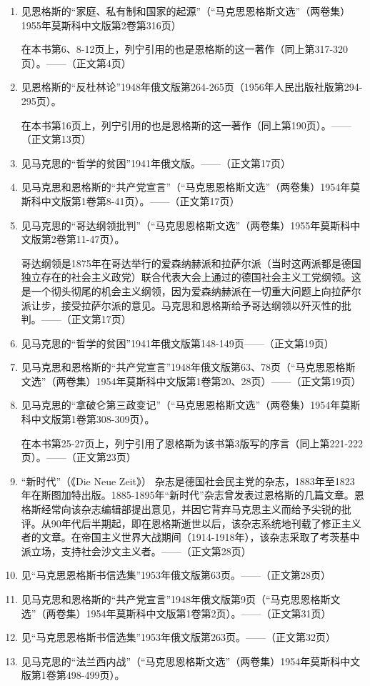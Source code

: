 \begin{enumerate}
	\item 见恩格斯的“家庭、私有制和国家的起源”（“马克思恩格斯文选”（两卷集）1955年莫斯科中文版第2卷第316页）
	
		在本书第6、8-12页上，列宁引用的也是恩格斯的这一著作（同上第317-320页）。——（正文第4页）
	\item 见恩格斯的“反杜林论”1948年俄文版第264-265页（1956年人民出版社版第294-295页）。
	
		在本书第16页上，列宁引用的也是恩格斯的这一著作（同上第190页）。——（正文第13页）
	\item 见马克思的“哲学的贫困”1941年俄文版。——（正文第17页）
	\item 见马克思和恩格斯的“共产党宣言”（“马克思恩格斯文选”（两卷集）1954年莫斯科中文版第1卷第8-41页）。——（正文第17页）
	\item 见马克思的“哥达纲领批判”（“马克思恩格斯文选”（两卷集）1955年莫斯科中文版第2卷第11-47页）。
	
		{\kaishu 哥达纲领}是1875年在哥达举行的爱森纳赫派和拉萨尔派（当时这两派都是德国独立存在的社会主义政党）联合代表大会上通过的德国社会主义工党纲领。这是一个彻头彻尾的机会主义纲领，因为爱森纳赫派在一切重大问题上向拉萨尔派让步，接受拉萨尔派的意见。马克思和恩格斯给予哥达纲领以歼灭性的批判。——（正文第17页）
	\item 见马克思的“哲学的贫困”1941年俄文版第148-149页——（正文第19页）
	\item 见马克思和恩格斯的“共产党宣言”1948年俄文版第63、78页（“马克思恩格斯文选”（两卷集）1954年莫斯科中文版第1卷第20、28页）——（正文第19页）
	\item 见马克思的“拿破仑第三政变记”（“马克思恩格斯文选”（两卷集）1954年莫斯科中文版第1卷第308-309页）。
	
		在本书第25-27页上，列宁引用了恩格斯为该书第3版写的序言（同上第221-222页）。——（正文第23页）
	\item {\kaishu “新时代”}（《Die Neue Zeit》） 杂志是德国社会民主党的杂志，1883年至1823年在斯图加特出版。1885-1895年“新时代”杂志曾发表过恩格斯的几篇文章。恩格斯经常向该杂志编辑部提出意见，并因它背弃马克思主义而给予尖锐的批评。从90年代后半期起，即在恩格斯逝世以后，该杂志系统地刊载了修正主义者的文章。在帝国主义世界大战期间（1914-1918年），该杂志采取了考茨基中派立场，支持社会沙文主义者。——（正文第28页）
	\item 见“马克思恩格斯书信选集”1953年俄文版第63页。——（正文第28页）
	\item 见马克思和恩格斯的“共产党宣言”1948年俄文版第9页（“马克思恩格斯文选”（两卷集）1954年莫斯科中文版第1卷第2页）。——（正文第31页）
	\item 见“马克思恩格斯书信选集”1953年俄文版第263页。——（正文第32页）
	\item 见马克思的“法兰西内战”（“马克思恩格斯文选”（两卷集）1954年莫斯科中文版第1卷第498-499页）。
		

\end{enumerate}
